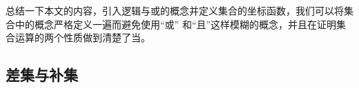总结一下本文的内容，引入逻辑与或的概念并定义集合的坐标函数，我们可以将集合中的概念严格定义一遍而避免使用“或” 和“且”这样模糊的概念，并且在证明集合运算的两个性质做到清楚了当。

\subsection{差集与补集}